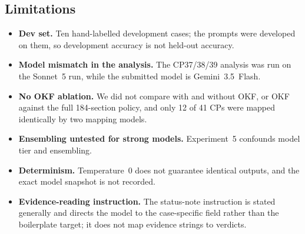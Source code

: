 \subsection{Limitations}
\label{sec:t2-limits}

\begin{itemize}
\item \textbf{Dev set.} Ten hand-labelled development cases; the prompts were developed on them, so development accuracy is not held-out accuracy.
\item \textbf{Model mismatch in the analysis.} The CP37/38/39 analysis was run on the Sonnet~5 run, while the submitted model is Gemini~3.5~Flash.
\item \textbf{No OKF ablation.} We did not compare with and without OKF, or OKF against the full 184-section policy, and only 12 of 41 CPs were mapped identically by two mapping models.
\item \textbf{Ensembling untested for strong models.} Experiment~5 confounds model tier and ensembling.
\item \textbf{Determinism.} Temperature~0 does not guarantee identical outputs, and the exact model snapshot is not recorded.
\item \textbf{Evidence-reading instruction.} The status-note instruction is stated generally and directs the model to the case-specific field rather than the boilerplate target; it does not map evidence strings to verdicts.
\end{itemize}
